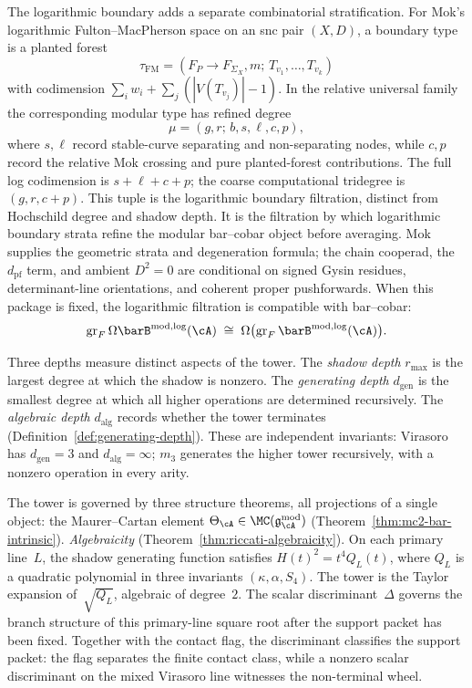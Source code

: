 The logarithmic boundary adds a separate combinatorial stratification.
For Mok's logarithmic Fulton--MacPherson space on an snc pair
$(X,D)$, a boundary type is a planted forest
\[
\tau_{\mathrm{FM}}
=(F_P\to F_{\Sigma_X},m;\,T_{v_1},\ldots,T_{v_k})
\]
with codimension
$\sum_iw_i+\sum_j(|V(T_{v_j})|-1)$. In the relative universal family
the corresponding modular type has refined degree
\[
\mu=(g,r;\,b,s,\ell,c,p),
\]
where $s,\ell$ record stable-curve separating and non-separating
nodes, while $c,p$ record the relative Mok crossing and pure
planted-forest contributions. The full log codimension is
$s+\ell+c+p$; the coarse computational tridegree is $(g,r,c+p)$.
This tuple is the logarithmic boundary filtration, distinct from
Hochschild degree and shadow depth. It is the filtration by which
logarithmic boundary strata refine the modular
bar--cobar object before averaging. Mok supplies the geometric
strata and degeneration formula; the chain cooperad, the
$d_{\mathrm{pf}}$ term, and ambient $D^2=0$ are conditional on signed
Gysin residues, determinant-line orientations, and coherent proper
pushforwards.
When this package is fixed, the logarithmic filtration is compatible
with bar--cobar:
\[
\operatorname{gr}_F\Omega\barB^{\mathrm{mod},\log}(\cA)
\;\cong\;
\Omega\bigl(\operatorname{gr}_F\barB^{\mathrm{mod},\log}(\cA)\bigr).
\]


Three depths measure distinct aspects of the tower.
The \emph{shadow depth} $r_{\max}$ is the largest degree at which the shadow is nonzero.
The \emph{generating depth} $d_{\mathrm{gen}}$ is the smallest degree at which all higher operations are determined recursively.
The \emph{algebraic depth} $d_{\mathrm{alg}}$ records whether the tower terminates
(Definition~\ref{def:generating-depth}).
These are independent invariants: Virasoro has
$d_{\mathrm{gen}} = 3$ and $d_{\mathrm{alg}} = \infty$; $m_3$
generates the higher tower recursively, with a nonzero operation in every arity.

The tower is governed by three structure theorems, all projections of a single object: the Maurer--Cartan element
$\Theta_\cA \in \MC(\gAmod)$
(Theorem~\ref{thm:mc2-bar-intrinsic}).
\emph{Algebraicity}
(Theorem~\ref{thm:riccati-algebraicity}).
On each primary line~$L$, the shadow generating function satisfies
$H(t)^2 = t^4 Q_L(t)$,
where $Q_L$ is a quadratic polynomial in three invariants $(\kappa, \alpha, S_4)$. The
tower is the Taylor expansion of~$\sqrt{Q_L}$, algebraic of degree~$2$.
The scalar discriminant~$\Delta$ governs the branch structure of this
primary-line square root after the support packet has been fixed.
Together with the contact flag, the discriminant classifies the support
packet: the flag separates the finite contact class, while a nonzero
scalar discriminant on the mixed Virasoro line witnesses the
non-terminal wheel.

